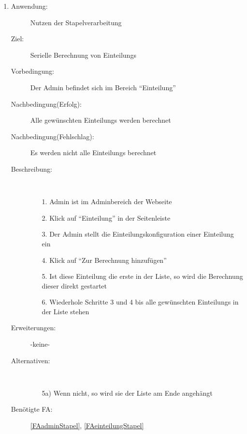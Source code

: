 \documentclass[parskip=full]{scrartcl}
\newcommand{\swtLabel}[1]{\textbf{/#1\arabic*0/}}
\begin{document}
\begin{enumerate} [label=\swtLabel{A}]
  \item \label{UCadminStapelverarbeitung}
    \begin{description}
  	\item[Anwendung:] Nutzen der Stapelverarbeitung
  	\item[Ziel:] Serielle Berechnung von \glspl{Einteilung}
  	\item[Vorbedingung:] Der \gls{Admin} befindet sich im Bereich
  	\enquote{\gls{Einteilung}}
  	\item[Nachbedingung(Erfolg):] Alle gewünschten \glspl{Einteilung} werden berechnet
  	\item[Nachbedingung(Fehlschlag):] Es werden nicht alle \glspl{Einteilung} berechnet
  	\item[Beschreibung:]~
  	\begin{enumerate}
  	  \item[1.] \gls{Admin} ist im \gls{Admin}bereich der Webseite
      \item[2.] Klick auf \enquote{\gls{Einteilung}} in der Seitenleiste
      \item[3.] Der \gls{Admin} stellt die \gls{Einteilungskonfiguration} einer \gls{Einteilung} ein
      \item[4.] Klick auf \enquote{Zur Berechnung hinzufügen}
      \item[5.] Ist diese \gls{Einteilung} die erste in der Liste, so wird die
      Berechnung dieser direkt gestartet
      \item[6.] Wiederhole Schritte 3 und 4 bis alle gewünschten \glspl{Einteilung} in
      der Liste stehen
  	\end{enumerate}
  	\item[Erweiterungen:] -keine-
  	\item[Alternativen:] ~
  	\begin{enumerate}
  	  \item[5a)] Wenn nicht, so wird sie der Liste am Ende angehängt
  	\end{enumerate}  
  	\item[Benötigte FA:] \ref{FAadminStapel}, \ref{FAeinteilungStapel}
  \end{description}
  

\end{enumerate}
\end{document}
